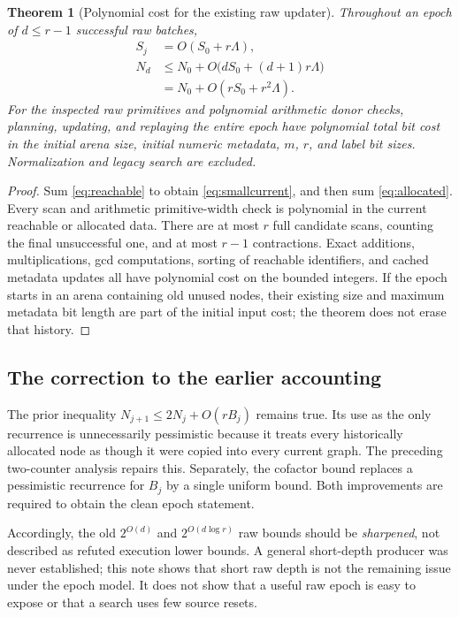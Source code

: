 \documentclass[11pt,letterpaper]{article}
\newtheorem{theorem}{Theorem}[section]
\theoremstyle{definition}
\theoremstyle{remark}\newtheorem{remark}[theorem]{Remark}
\begin{document}
\begin{theorem}[Polynomial cost for the existing raw updater]
\label{thm:native}
Throughout an epoch of $d\le r-1$ successful raw batches,
\begin{align}
 S_j&=O(S_0+r\Lambda),\label{eq:smallcurrent}\\
 N_d&\le N_0+O\bigl(dS_0+(d+1)r\Lambda\bigr)\\
    &=N_0+O(rS_0+r^2\Lambda).\label{eq:smallallocated}
\end{align}
For the inspected raw primitives and polynomial arithmetic donor checks,
planning, updating, and replaying the entire epoch have polynomial total bit
cost in the initial arena size, initial numeric metadata, $m$, $r$, and label
bit sizes. Normalization and legacy search are excluded.
\end{theorem}
\begin{proof}
Sum \eqref{eq:reachable} to obtain \eqref{eq:smallcurrent}, and then sum
\eqref{eq:allocated}. Every scan and arithmetic primitive-width check is
polynomial in the current reachable or allocated data. There are at most $r$
full candidate scans, counting the final unsuccessful one, and at most $r-1$
contractions. Exact additions, multiplications, gcd computations, sorting of
reachable identifiers, and cached metadata updates all have polynomial cost
on the bounded integers. If the epoch starts in an arena containing old unused
nodes, their existing size and maximum metadata bit length are part of the
initial input cost; the theorem does not erase that history.
\end{proof}

\subsection{The correction to the earlier accounting}

The prior inequality $N_{j+1}\le2N_j+O(rB_j)$ remains true. Its use as the
only recurrence is unnecessarily pessimistic because it treats every
historically allocated node as though it were copied into every current graph.
The preceding two-counter analysis repairs this. Separately, the cofactor
bound replaces a pessimistic recurrence for $B_j$ by a single uniform bound.
Both improvements are required to obtain the clean epoch statement.

Accordingly, the old $2^{O(d)}$ and $2^{O(d\log r)}$ raw bounds should be
\emph{sharpened}, not described as refuted execution lower bounds. A general
short-depth producer was never established; this note shows that short raw
depth is not the remaining issue under the epoch model. It does not show that
a useful raw epoch is easy to expose or that a search uses few source resets.
\end{document}
